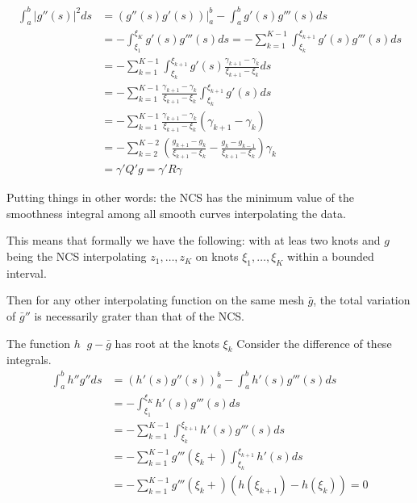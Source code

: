 \documentclass[a4paper]{article}
\newcommand{\clo}[1]{{\left [ #1 \right ]}}
\newcommand{\brac}[1]{{\left ( #1 \right )}}
\newcommand{\induc}[1]{{\left . #1 \right \vert}}
\newcommand{\abs}[1]{{\left | #1 \right |}}
\newcommand{\defn}{\mathop{\overset{\Delta}{=}}\nolimits}
\begin{document}
\begin{align*}
	\int_a^b \abs{g''(s)}^2 ds &= \induc{\brac{g''(s)g'(s)}}_a^b - \int_a^b g'(s) g'''(s) ds \\
	&= - \int_{\xi_1}^{\xi_K} g'(s) g'''(s) ds = - \sum_{k=1}^{K-1} \int_{\xi_k}^{\xi_{k+1}} g'(s) g'''(s) ds\\
	&= - \sum_{k=1}^{K-1} \int_{\xi_k}^{\xi_{k+1}} g'(s) \frac{\gamma_{k+1}-\gamma_k}{\xi_{k+1}-\xi_k} ds\\
	&= - \sum_{k=1}^{K-1} \frac{\gamma_{k+1}-\gamma_k}{\xi_{k+1}-\xi_k} \int_{\xi_k}^{\xi_{k+1}} g'(s) ds\\
	&= - \sum_{k=1}^{K-1} \frac{\gamma_{k+1}-\gamma_k}{\xi_{k+1}-\xi_k} \brac{\gamma_{k+1}-\gamma_k}\\
	&= - \sum_{k=2}^{K-2} \brac{\frac{g_{k+1}-g_k}{\xi_{k+1}-\xi_k} - \frac{g_k-g_{k-1}}{\xi_{k+1}-\xi_k}} \gamma_k \\
	& = \gamma' Q' g = \gamma' R \gamma
\end{align*}

Putting things in other words:
the NCS has the minimum value of the smoothness integral among all smooth curves interpolating the data.

This means that formally we have the following:
with at leas two knots and $g$ being the NCS interpolating $z_1,\ldots,z_K$ on knots $\xi_1,\ldots,\xi_K$ within a bounded interval.

Then for any other interpolating function on the same mesh $\bar{g}$, the total variation of $\bar{g}''$ is necessarily grater than that of the NCS.


The function $h \defn g - \bar{g}$ has root at the knots $\xi_k$
Consider the difference of these integrals. 
\begin{align*}
	\int_a^b h'' g'' ds
	& = \brac{h'(s)g''(s)}_a^b - \int_a^b h'(s) g'''(s) ds \\
	& = - \int_{\xi_1}^{\xi_K} h'(s) g'''(s) ds \\
	& = - \sum_{k=1}^{K-1} \int_{\xi_k}^{\xi_{k+1}} h'(s) g'''(s) ds \\
	& = - \sum_{k=1}^{K-1}  g'''(\xi_k+) \int_{\xi_k}^{\xi_{k+1}} h'(s) ds \\
	& = - \sum_{k=1}^{K-1}  g'''(\xi_k+) \brac{h(\xi_{k+1})-h(\xi_k)} = 0
\end{align*}
\end{document}
